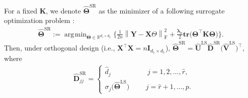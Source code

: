 \documentclass[alpha-refs]{wiley-article}
\DeclareMathOperator*{\argmin}{\arg\!\min}
\begin{document}
\begin{proposition} \label{surrogate}
    For a fixed $\boldsymbol{K}$, we denote $\widehat{\boldsymbol{\Theta}}^{\text{SR}}$ as the minimizer of a following surrogate optimization problem :
    \begin{align} \label{closed_form}
        \widehat{\boldsymbol{\Theta}}^{\text{SR}} :=
        \argmin_{\boldsymbol{\Theta}\in\mathbb{R}^{d_{1} \times d_{2}}} \Bigg\{ \frac{1}{2n} \left\| \boldsymbol{Y}-\boldsymbol{X}\Theta \right\|_{\text{F}}^{2} + \frac{\boldsymbol{\lambda}_{n}}{2}
        \textbf{tr}\big(\boldsymbol{\Theta}^{\top} \boldsymbol{K} \boldsymbol{\Theta} \big) \Bigg\}.
    \end{align}
    Then, under orthogonal design (i.e., $\boldsymbol{X}^{\top}\boldsymbol{X}=n\boldsymbol{I}_{d_{1} \times d_{1}}$),
    $\widehat{\boldsymbol{\Theta}}^{\text{SR}} = \widehat{\boldsymbol{U}}^{\text{LS}}\widehat{\boldsymbol{D}}^{\text{SR}}\big(\widehat{\boldsymbol{V}}^{\text{LS}}\big)^{\top}$, where
    \begin{align*}
        &\widehat{\boldsymbol{D}}^{\text{SR}}_{jj} =
        \begin{cases}
            \widehat{d}_{j} \qquad \qquad \quad \, j = 1,2,\dots,\widehat{r}, \\
            \sigma_{j}\big(\widehat{\boldsymbol{\Theta}}^{\text{LS}} \big)
            \quad \,\,\,\,\,\,\,\, j = \widehat{r}+1,\dots,p.
        \end{cases}
    \end{align*}
\end{proposition}
\end{document}
